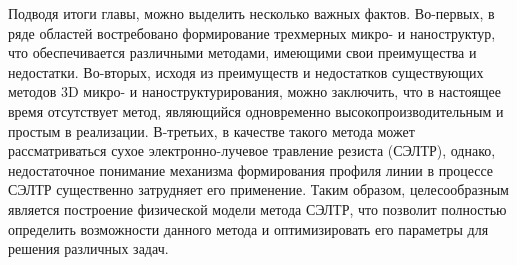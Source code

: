 Подводя итоги главы, можно выделить несколько важных фактов. Во-первых, в ряде областей востребовано формирование трехмерных микро- и наноструктур, что обеспечивается различными методами, имеющими свои преимущества и недостатки. Во-вторых, исходя из преимуществ и недостатков существующих методов 3D микро- и наноструктурирования, можно заключить, что в настоящее время отсутствует метод, являющийся одновременно высокопроизводительным и простым в реализации. В-третьих, в качестве такого метода может рассматриваться сухое электронно-лучевое травление резиста (СЭЛТР), однако, недостаточное понимание механизма формирования профиля линии в процессе СЭЛТР существенно затрудняет его применение. Таким образом, целесообразным является построение физической модели метода СЭЛТР, что позволит полностью определить возможности данного метода и оптимизировать его параметры для решения различных задач.




